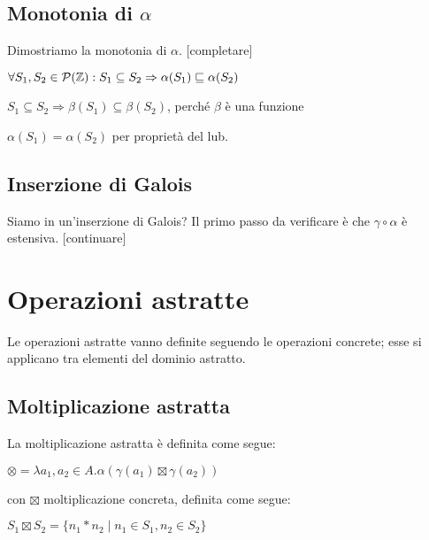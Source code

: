 \documentclass[a4paper, 12pt, oneside,fleqn]{book}
\begin{document}
\subsection{Monotonia di $\alpha$}
Dimostriamo la monotonia di $\alpha$.
[completare]
\begin{center}
	$ \forall S_1, S_2 \in \mathcal{P}(\mathbb{Z}) : S_1 \subseteq S_2 \Rightarrow \alpha(S_1) \sqsubseteq \alpha(S_2) $
\end{center}
\begin{center}
	$ S_1 \subseteq S_2 \Rightarrow \beta(S_1) \subseteq \beta(S_2) $, perché $\beta$ è  una funzione
\end{center}
\begin{center}
	$ \alpha(S_1) = \alpha(S_2) $ per proprietà del lub.
\end{center}

\subsection{Inserzione di Galois}
Siamo in un'inserzione di Galois? Il primo passo da verificare è che $\gamma \circ \alpha$ è estensiva. [continuare]

\section{Operazioni astratte}
Le operazioni astratte vanno definite seguendo le operazioni concrete; esse si applicano tra elementi del dominio astratto.

\subsection{Moltiplicazione astratta}

La moltiplicazione astratta è definita come segue:

\begin{center}
	$ \otimes = \lambda a_1,a_2 \in A . \alpha(\gamma(a_1) \boxtimes \gamma(a_2)) $
\end{center}
con $\boxtimes$ moltiplicazione concreta, definita come segue:

\begin{center}
	$ S_1 \boxtimes S_2 = \{ n_1 * n_2 \mid n_1 \in S_1, n_2 \in S_2 \} $
\end{center}
\end{document}
